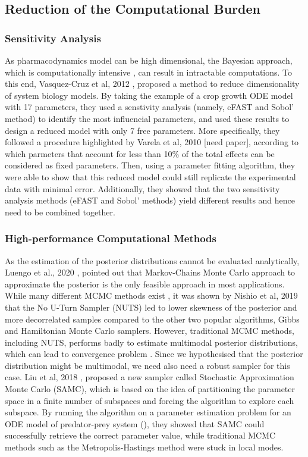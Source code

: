 \documentclass[11pt]{article}
\begin{document}
\subsection{Reduction of the Computational Burden}
\subsubsection{Sensitivity Analysis}
As pharmacodynamics model can be high dimensional, the Bayesian approach, which is computationally intensive \cite{revParamEst}, can result in intractable computations. To this end, Vasquez-Cruz et al, 2012 \cite{tomgro}, proposed a method to reduce dimensionality of system biology models. By taking the example of a crop growth ODE model with 17 parameters, they used a senstivity analysis (namely, eFAST and Sobol' method) to identify the most influencial parameters, and used these results to design a reduced model with only 7 free parameters. More specifically, they followed a procedure highlighted by Varela et al, 2010 [need paper], according to which parmeters that account for less than 10\% of the total effects can be considered as fixed parameters. Then, using a parameter fitting algorithm, they were able to show that this reduced model could still replicate the experimental data with minimal error. Additionally, they showed that the two sensitivity analysis methods (eFAST and Sobol' methods) yield different results and hence need to be combined together.

\subsubsection{High-performance Computational Methods}
As the estimation of the posterior distributions cannot be evaluated analytically, Luengo et al., 2020 \cite{MCMethods}, pointed out that Markov-Chains Monte Carlo approach to approximate the posterior is the only feasible approach in most applications. While many different MCMC methods exist \cite{ReviewMCMCAlgo}, it was shown by Nishio et al, 2019 \cite{NUTSvsHMCvsGibbs} that the No U-Turn Sampler (NUTS) led to lower skewness of the posterior and more decorrelated samples compared to the other two popular algorithms, Gibbs and Hamiltonian Monte Carlo samplers. However, traditional MCMC methods, including NUTS, performs badly to estimate multimodal posterior distributions, which can lead to convergence problem \cite{mcmcTrapped}. Since we hypothesised that the posterior distribution might be multimodal, we need also need a robust sampler for this case. Liu et al, 2018 \cite{liu_wang}, proposed a new sampler called Stochastic Approximation Monte Carlo (SAMC), which is based on the idea of partitioning the parameter space in a finite number of subspaces and forcing the algorithm to explore each subspace. By running the algorithm on a parameter estimation problem for an ODE model of predator-prey system (\cite{fussmann}), they showed that SAMC could successfully retrieve the correct parameter value, while traditional MCMC methods such as the Metropolis-Hastings method were stuck in local modes.
\end{document}
